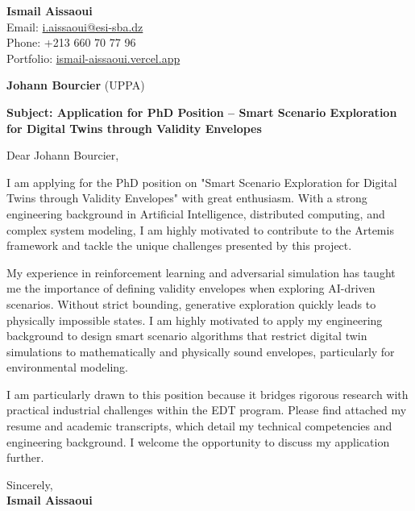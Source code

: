 \documentclass[11pt,a4paper]{article}
\begin{document}
\thispagestyle{empty}

\begin{flushright}
\textbf{Ismail Aissaoui} \\
Email: \href{mailto:i.aissaoui@esi-sba.dz}{i.aissaoui@esi-sba.dz} \\
Phone: +213 660 70 77 96 \\
Portfolio: \href{https://ismail-aissaoui.vercel.app}{ismail-aissaoui.vercel.app}
\end{flushright}

\vspace{1em}

\begin{flushleft}
\textbf{Johann Bourcier} (UPPA)
\end{flushleft}

\vspace{1em}
\noindent\textbf{Subject: Application for PhD Position -- Smart Scenario Exploration for Digital Twins through Validity Envelopes}
\vspace{1em}

\noindent Dear Johann Bourcier,

\vspace{1em}
\noindent
I am applying for the PhD position on "Smart Scenario Exploration for Digital Twins through Validity Envelopes" with great enthusiasm. With a strong engineering background in Artificial Intelligence, distributed computing, and complex system modeling, I am highly motivated to contribute to the Artemis framework and tackle the unique challenges presented by this project.

\vspace{0.5em}
\noindent
My experience in reinforcement learning and adversarial simulation has taught me the importance of defining validity envelopes when exploring AI-driven scenarios. Without strict bounding, generative exploration quickly leads to physically impossible states. I am highly motivated to apply my engineering background to design smart scenario algorithms that restrict digital twin simulations to mathematically and physically sound envelopes, particularly for environmental modeling.

\vspace{0.5em}
\noindent
I am particularly drawn to this position because it bridges rigorous research with practical industrial challenges within the EDT program. Please find attached my resume and academic transcripts, which detail my technical competencies and engineering background. I welcome the opportunity to discuss my application further.

\vspace{1.5em}
\noindent
Sincerely, \\[0.5em]
\textbf{Ismail Aissaoui}
\end{document}

